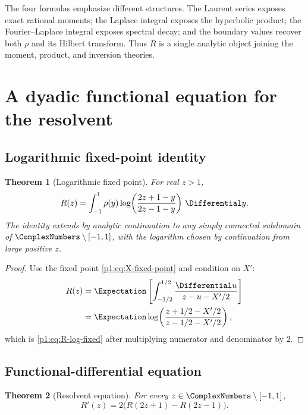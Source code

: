 \documentclass[11pt]{article}
\newtheorem{theorem}{Theorem}[section]
\theoremstyle{definition}
\theoremstyle{remark}
\begin{document}
\begin{remark}
The four formulas emphasize different structures.  The Laurent series exposes exact
rational moments; the Laplace integral exposes the hyperbolic product; the Fourier--Laplace
integral exposes spectral decay; and the boundary values recover both \(\rho\) and its
Hilbert transform.  Thus \(R\) is a single analytic object joining the moment, product,
and inversion theories.
\end{remark}

\section{A dyadic functional equation for the resolvent}

\subsection{Logarithmic fixed-point identity}

\begin{theorem}[Logarithmic fixed point]\label{p1:thm:R-log-fixed}
For real \(z>1\),
\begin{equation}
 R(z)=\int_{-1}^{1}\rho(y)
 \log\!\left(\frac{2z+1-y}{2z-1-y}\right)\,\Differential y.           \label{p1:eq:R-log-fixed}
\end{equation}
The identity extends by analytic continuation to any simply connected subdomain of
\(\ComplexNumbers\setminus[-1,1]\), with the logarithm chosen by continuation from large positive
\(z\).
\end{theorem}

\begin{proof}
Use the fixed point \eqref{p1:eq:X-fixed-point} and condition on \(X'\):
\begin{align*}
 R(z)
 &=\Expectation\left[\int_{-1/2}^{1/2}
   \frac{\Differential u}{z-u-X'/2}\right]\\
 &=\Expectation\log\!\left(\frac{z+1/2-X'/2}{z-1/2-X'/2}\right),
\end{align*}
which is \eqref{p1:eq:R-log-fixed} after multiplying numerator and denominator by \(2\).
\end{proof}

\subsection{Functional-differential equation}

\begin{theorem}[Resolvent equation]\label{p1:thm:R-dde}
For every \(z\in\ComplexNumbers\setminus[-1,1]\),
\begin{equation}
 \boxed{R'(z)=2\bigl(R(2z+1)-R(2z-1)\bigr).}                \label{p1:eq:R-dde}
\end{equation}
\end{theorem}
\end{document}
